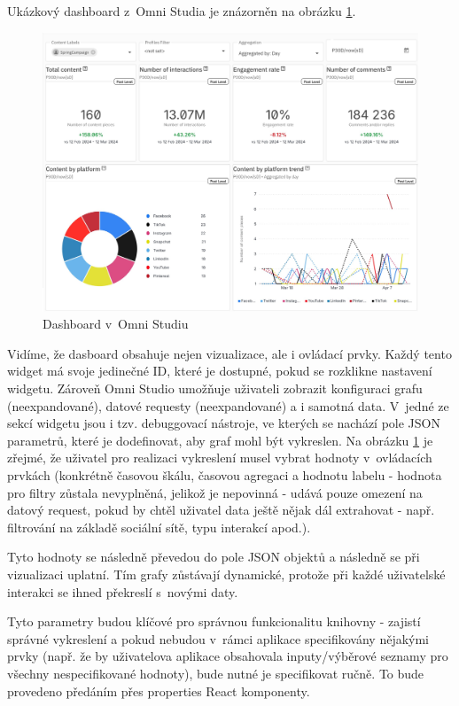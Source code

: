 \documentclass[czech, bc, kiv, he, iso690numb]{fasthesis}
\begin{document}
Ukázkový dashboard z~Omni Studia je znázorněn na obrázku \ref{fig:omniStudioDashboard}.
\begin{figure}
	\centering
	\includegraphics[width=1\textwidth]{pictures/omni-studio.png}
	\caption{Dashboard v~Omni Studiu}
	\label{fig:omniStudioDashboard}
\end{figure}
Vidíme, že dasboard obsahuje nejen vizualizace, ale i ovládací prvky. Každý tento widget má svoje jedinečné ID, které je dostupné, pokud se rozklikne nastavení widgetu. Zároveň Omni Studio 
umožňuje uživateli zobrazit konfiguraci grafu (neexpandované), datové requesty (neexpandované) a i samotná data. V~jedné ze sekcí widgetu jsou i tzv. debuggovací nástroje, ve kterých se nachází pole JSON parametrů,
které je dodefinovat, aby graf mohl být vykreslen. Na obrázku \ref{fig:omniStudioDashboard} je zřejmé, že uživatel pro realizaci vykreslení musel vybrat hodnoty v~ovládacích prvkách (konkrétně 
časovou škálu, časovou agregaci a hodnotu labelu - hodnota pro filtry zůstala nevyplněná, jelikož je nepovinná - udává pouze omezení na datový request, pokud by chtěl uživatel data ještě nějak
dál extrahovat - např. filtrování na základě sociální sítě, typu interakcí apod.). 

Tyto hodnoty se následně převedou do pole JSON objektů a následně se při vizualizaci uplatní. Tím grafy zůstávají dynamické, protože při každé uživatelské interakci se ihned překreslí s~novými
daty.

Tyto parametry budou klíčové pro správnou funkcionalitu knihovny - zajistí správné vykreslení a pokud nebudou v~rámci aplikace specifikovány nějakými prvky (např. že by uživatelova aplikace obsahovala
inputy/výběrové seznamy pro všechny nespecifikované hodnoty), bude nutné je specifikovat ručně. To bude provedeno předáním přes properties React komponenty.
\end{document}
